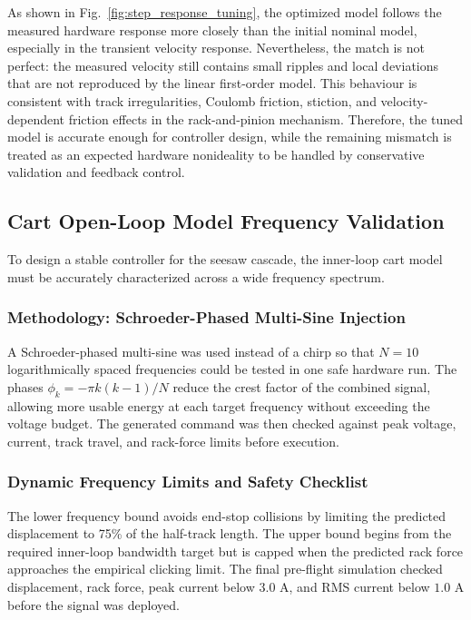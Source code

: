 \documentclass[11pt,a4paper]{article}
\begin{document}
As shown in Fig.~\ref{fig:step_response_tuning}, the optimized model follows the measured hardware response more closely than the initial nominal model, especially in the transient velocity response. Nevertheless, the match is not perfect: the measured velocity still contains small ripples and local deviations
that are not reproduced by the linear first-order model. This behaviour is consistent with track irregularities, Coulomb friction, stiction, and velocity-dependent friction effects in the rack-and-pinion mechanism. Therefore, the tuned model is accurate enough for controller design, while the
remaining mismatch is treated as an expected hardware nonideality to be handled by conservative validation and feedback control.

\subsection{Cart Open-Loop Model Frequency Validation}\label{sub:cart_ol_freq_val}
To design a stable controller for the seesaw cascade, the inner-loop cart model must be accurately characterized across a wide frequency spectrum.

\subsubsection{Methodology: Schroeder-Phased Multi-Sine Injection}\label{subsub:schroeder_multisine}
A Schroeder-phased multi-sine was used instead of a chirp so that $N=10$ logarithmically spaced frequencies could be tested in one safe hardware run. The phases $\phi_k=-\pi k(k-1)/N$ reduce the crest factor of the combined signal, allowing more usable energy at each target frequency without exceeding the voltage budget. The generated command was then checked against peak voltage, current, track travel, and rack-force limits before execution.

\subsubsection{Dynamic Frequency Limits and Safety Checklist}\label{subsub:cart_model_safety}
The lower frequency bound avoids end-stop collisions by limiting the predicted displacement to 75\% of the half-track length. The upper bound begins from the required inner-loop bandwidth target but is capped when the predicted rack force approaches the empirical clicking limit. The final pre-flight simulation checked displacement, rack force, peak current below $3.0$ A, and RMS current below $1.0$ A before the signal was deployed.
\end{document}

